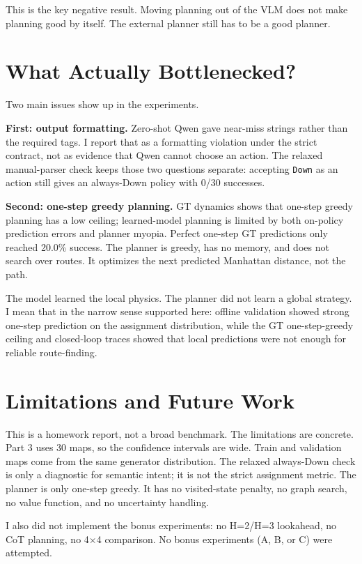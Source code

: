\documentclass{article}
\newcommand{\code}[1]{\texttt{#1}}
\begin{document}
This is the key negative result. Moving planning out of the VLM does not make planning good by itself. The external planner still has to be a good planner.

\section{What Actually Bottlenecked?}

Two main issues show up in the experiments.

\textbf{First: output formatting.} Zero-shot Qwen gave near-miss strings rather than the required tags. I report that as a formatting violation under the strict contract, not as evidence that Qwen cannot choose an action. The relaxed manual-parser check keeps those two questions separate: accepting \code{Down} as an action still gives an always-Down policy with 0/30 successes.

\textbf{Second: one-step greedy planning.} GT dynamics shows that one-step greedy planning has a low ceiling; learned-model planning is limited by both on-policy prediction errors and planner myopia. Perfect one-step GT predictions only reached 20.0\% success. The planner is greedy, has no memory, and does not search over routes. It optimizes the next predicted Manhattan distance, not the path.

The model learned the local physics. The planner did not learn a global strategy. I mean that in the narrow sense supported here: offline validation showed strong one-step prediction on the assignment distribution, while the GT one-step-greedy ceiling and closed-loop traces showed that local predictions were not enough for reliable route-finding.

\section{Limitations and Future Work}

This is a homework report, not a broad benchmark. The limitations are concrete. Part 3 uses 30 maps, so the confidence intervals are wide. Train and validation maps come from the same generator distribution. The relaxed always-Down check is only a diagnostic for semantic intent; it is not the strict assignment metric. The planner is only one-step greedy. It has no visited-state penalty, no graph search, no value function, and no uncertainty handling.

I also did not implement the bonus experiments: no H=2/H=3 lookahead, no CoT planning, no 4$\times$4 comparison. No bonus experiments (A, B, or C) were attempted.
\end{document}
